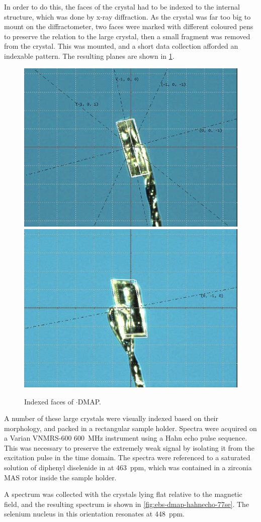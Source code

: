 \begin{refsection}
In order to do this, the faces of the crystal had to be indexed to the internal structure, which was done by x-ray diffraction.
As the crystal was far too big to mount on the diffractometer, two faces were marked with different coloured pens to preserve the relation to the large crystal, then a small fragment was removed from the crystal.
This was mounted, and a short data collection afforded an indexable pattern.
The resulting planes are shown in \cref{fig:ebs-ph-dmap-index}.

\begin{figure}
  \centering
  \includegraphics[width=0.48\linewidth]{Figures/xtal-b.jpg}
  \includegraphics[width=0.48\linewidth]{Figures/xtal-c.jpg}
  \caption{Indexed faces of $ \cdot $DMAP.}\label{fig:ebs-ph-dmap-index}
\end{figure}

A number of these large crystals were visually indexed based on their morphology, and packed in a rectangular sample holder.
Spectra were acquired on a Varian VNMRS-600 600~MHz instrument using a Hahn echo pulse sequence.
This was necessary to preserve the extremely weak signal by isolating it from the excitation pulse in the time domain.
The spectra were referenced to a saturated solution of diphenyl diselenide in  at 463~ppm, which was contained in a zirconia MAS rotor inside the sample holder.\autocite{Duddeck1995}

A spectrum was collected with the crystals lying flat relative to the magnetic field, and the resulting spectrum is shown in \cref{fig:ebs-dmap-hahnecho-77se}.
The selenium nucleus in this orientation resonates at 448~ppm.


\end{refsection}
